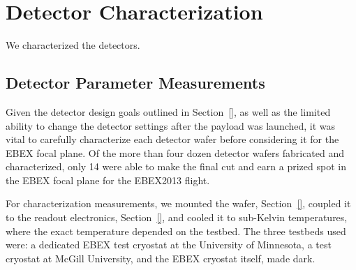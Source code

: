 \chapter{Detector Characterization}
\label{characterization_chapter}

We characterized the detectors. 

\section{Detector Parameter Measurements}
\label{sec:parameter_measurements}


Given the detector design goals outlined in Section~\ref{}, as well as the limited ability to change the detector settings after the payload was launched, it was vital to carefully characterize each detector wafer before considering it for the \ac{EBEX} focal plane. 
Of the more than four dozen detector wafers fabricated and characterized, only 14 were able to make the final cut and earn a prized spot in the \ac{EBEX} focal plane for the \ac{EBEX2013} flight. 

For characterization measurements, we mounted the wafer, Section~\ref{}, coupled it to the readout electronics, Section~\ref{}, and cooled it to sub-Kelvin temperatures, where the exact temperature depended on the testbed. 
The three testbeds used were: a dedicated \ac{EBEX} test cryostat at the University of Minnesota, a test cryostat at McGill University, and the \ac{EBEX} cryostat itself, made dark. 

